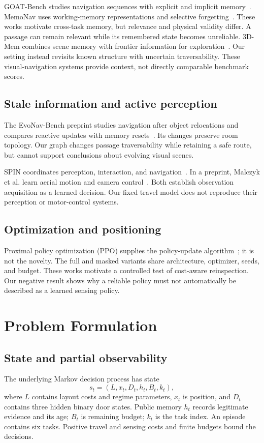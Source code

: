 \documentclass[journal]{IEEEtai}
\begin{document}
GOAT-Bench studies navigation sequences with explicit and implicit memory~\cite{Khanna_2024_CVPR}. MemoNav uses working-memory representations and selective forgetting~\cite{Li_2024_CVPR}. These works motivate cross-task memory, but relevance and physical validity differ. A passage can remain relevant while its remembered state becomes unreliable. 3D-Mem combines scene memory with frontier information for exploration~\cite{Yang_2025_CVPR}. Our setting instead revisits known structure with uncertain traversability. These visual-navigation systems provide context, not directly comparable benchmark scores.

\subsection{Stale information and active perception}
The EvoNav-Bench preprint studies navigation after object relocations and compares reactive updates with memory resets~\cite{Wang2026EvoNav}. Its changes preserve room topology. Our graph changes passage traversability while retaining a safe route, but cannot support conclusions about evolving visual scenes.

SPIN coordinates perception, interaction, and navigation~\cite{Uppal_2024_CVPR}. In a preprint, Malczyk et al. learn aerial motion and camera control~\cite{Malczyk2026ActivePerception}. Both establish observation acquisition as a learned decision. Our fixed travel model does not reproduce their perception or motor-control systems.

\subsection{Optimization and positioning}
Proximal policy optimization (PPO) supplies the policy-update algorithm~\cite{Schulman2017PPO}; it is not the novelty. The full and masked variants share architecture, optimizer, seeds, and budget. These works motivate a controlled test of cost-aware reinspection. Our negative result shows why a reliable policy must not automatically be described as a learned sensing policy.

\section{Problem Formulation}
\subsection{State and partial observability}
The underlying Markov decision process has state
\begin{equation}
s_t=(L,x_t,D_t,h_t,B_t,k_t),
\end{equation}
where $L$ contains layout costs and regime parameters, $x_t$ is position, and $D_t$ contains three hidden binary door states. Public memory $h_t$ records legitimate evidence and its age; $B_t$ is remaining budget; $k_t$ is the task index. An episode contains six tasks. Positive travel and sensing costs and finite budgets bound the decisions.
\end{document}
